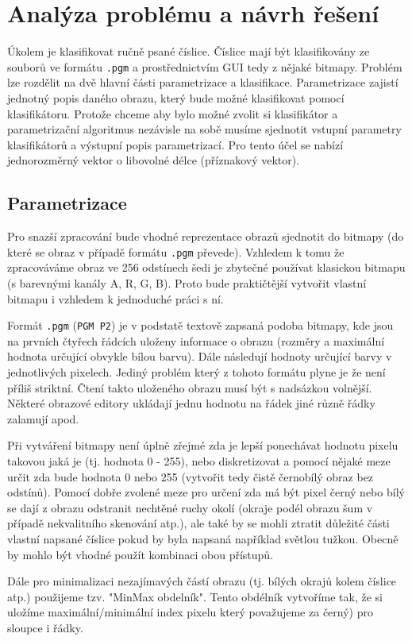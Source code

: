 \documentclass[12pt]{article}
\begin{document}
\section{Analýza problému a návrh řešení}
Úkolem je klasifikovat ručně psané číslice. Číslice mají být klasifikovány ze souborů ve formátu \texttt{.pgm} a prostřednictvím GUI tedy z nějaké bitmapy. Problém lze rozdělit na dvě hlavní části parametrizace a klasifikace. Parametrizace zajistí jednotný popis daného obrazu, který bude možné klasifikovat pomocí klasifikátoru. Protože chceme aby bylo možné zvolit si klasifikátor a parametrizační algoritmus nezávisle na sobě musíme sjednotit vstupní parametry klasifikátorů a výstupní popis parametrizací. Pro tento účel se nabízí jednorozměrný vektor o libovolné délce (příznakový vektor).

\subsection{Parametrizace}
Pro snazší zpracování bude vhodné reprezentace obrazů sjednotit do bitmapy (do které se obraz v případě formátu \texttt{.pgm} převede). Vzhledem k tomu že zpracováváme obraz ve 256 odstínech šedi je zbytečné používat klasickou bitmapu (s barevnými kanály A, R, G, B). Proto bude praktičtější vytvořit vlastní bitmapu i vzhledem k jednoduché práci s ní.

Formát \texttt{.pgm} (\texttt{PGM P2}) je v podstatě textově zapsaná podoba bitmapy, kde jsou na prvních čtyřech řádcích uloženy informace o obrazu (rozměry a maximální hodnota určující obvykle bílou barvu). Dále následují hodnoty určující barvy v jednotlivých pixelech. Jediný problém který z tohoto formátu plyne je že není příliš striktní. Čtení takto uloženého obrazu musí být s nadsázkou volnější. Některé obrazové editory ukládají jednu hodnotu na řádek jiné různě řádky zalamují apod.

Při vytváření bitmapy není úplně zřejmé zda je lepší ponechávat hodnotu pixelu takovou jaká je (tj. hodnota 0 - 255), nebo diskretizovat a pomocí nějaké meze určit zda bude hodnota 0 nebo 255 (vytvořit tedy čistě černobílý obraz bez odstínů).
Pomocí dobře zvolené meze pro určení zda má být pixel černý nebo bílý se dají z obrazu odstranit nechtěné ruchy okolí (okraje podél obrazu šum v případě nekvalitního skenování atp.), ale také by se mohli ztratit důležité části vlastní napsané číslice pokud by byla napsaná například světlou tužkou. Obecně by mohlo být vhodné použít kombinaci obou přístupů.

Dále pro minimalizaci nezajímavých částí obrazu (tj. bílých okrajů kolem číslice atp.) použijeme tzv. "MinMax obdelník". Tento obdélník vytvoříme tak, že si uložíme maximální/minimální index  pixelu který považujeme za černý) pro sloupce i řádky. 
\end{document}
